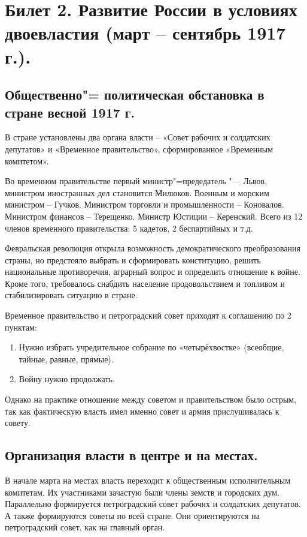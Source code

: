 \section{Билет 2. Развитие России в условиях двоевластия (март – сентябрь 1917 г.).}

\subsection{Общественно"= политическая обстановка в стране весной 1917 г.}

В стране установлены два органа власти – «Совет рабочих и солдатских депутатов» и «Временное правительство», сформированное «Временным комитетом».

Во временном правительстве первый министр"=предедатель "--- Львов, министром иностранных дел становится Милюков. Военным и морским министром – Гучков. Министром торговли и промышленности – Коновалов. Министром финансов – Терещенко. Министр Юстиции – Керенский. Всего из 12 членов временного правительства: 5 кадетов, 2 беспартийных и т.д.

Февральская революция открыла возможность демократического преобразования страны, но предстояло выбрать и сформировать конституцию, решить национальные противоречия, аграрный вопрос и определить отношение к войне. Кроме того, требовалось снабдить население продовольствием и топливом и стабилизировать ситуацию в стране.

Временное правительство и петроградский совет приходят к соглашению по 2 пунктам:

\begin{enumerate}
    \item Нужно избрать учредительное собрание по «четырёхвостке» (всеобщие, тайные, равные, прямые).
    \item Войну нужно продолжать.
\end{enumerate}
Однако на практике отношение между советом и правительством было острым, так как фактическую власть имел именно совет и армия прислушивалась к совету.



\subsection{Организация власти в центре и на местах.}

В начале марта на местах власть переходит к общественным исполнительным комитетам. Их участниками зачастую были члены земств и городских дум. 
Параллельно формируется петроградский совет рабочих и солдатских депутатов. А также формируются советы по всей стране. Они ориентируются на петроградский совет, как на главный орган.



